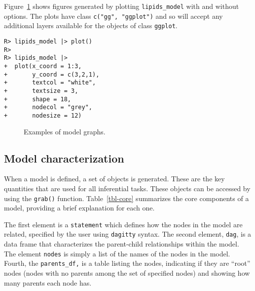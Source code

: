 \documentclass[
  11pt,
  article]{jss}
\begin{document}
Figure~\ref{fig-plots} shows figures generated by plotting
\texttt{lipids\_model} with and without options. The plots have class
\texttt{c("gg",\ "ggplot")} and so will accept any additional layers
available for the objects of class \texttt{ggplot}.

\begin{verbatim}
R> lipids_model |> plot()
R> 
R> lipids_model |>
+  plot(x_coord = 1:3,
+       y_coord = c(3,2,1),
+       textcol = "white",
+       textsize = 3,
+       shape = 18,
+       nodecol = "grey",
+       nodesize = 12)
\end{verbatim}

\begin{figure}[h]

\begin{minipage}{0.50\linewidth}



\end{minipage}%
%
\begin{minipage}{0.50\linewidth}



\end{minipage}%

\caption{\label{fig-plots}Examples of model graphs.}

\end{figure}%

\subsection{Model characterization}\label{model-characterization}

When a model is defined, a set of objects is generated. These are the
key quantities that are used for all inferential tasks. These objects
can be accessed by using the \texttt{grab()} function.
Table~\ref{tbl-core} summarizes the core components of a model,
providing a brief explanation for each one.

The first element is a \texttt{statement} which defines how the nodes in
the model are related, specified by the user using \texttt{dagitty}
syntax. The second element, \texttt{dag}, is a data frame that
characterizes the parent-child relationships within the model. The
element \texttt{nodes} is simply a list of the names of the nodes in the
model. Fourth, the \texttt{parents\_df,} is a table listing the nodes,
indicating if they are ``root'' nodes (nodes with no parents among the
set of specified nodes) and showing how many parents each node has.
\end{document}
